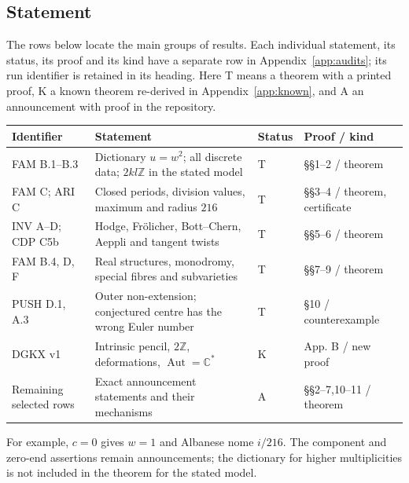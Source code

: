 \documentclass[11pt,a4paper]{article}
\theoremstyle{plain}
\theoremstyle{definition}
\DeclareMathOperator{\Aut}{Aut}
\begin{document}
\subsection*{Statement}
\noindent The rows below locate the main groups of results. Each individual statement, its status, its proof and its kind have a separate row in Appendix~\ref{app:audits}; its run identifier is retained in its heading. Here T means a theorem with a printed proof, K a known theorem re-derived in Appendix~\ref{app:known}, and A an announcement with proof in the repository.
\begin{center}\small
\begin{tabularx}{\linewidth}{@{}lYll@{}}
\toprule Identifier & Statement & Status & Proof / kind\\\midrule
FAM B.1--B.3 & Dictionary $u=w^2$; all discrete data; $2kl\mathbb Z$ in the stated model & T & \S\S1--2 / theorem\\
FAM C; ARI C & Closed periods, division values, maximum and radius $216$ & T & \S\S3--4 / theorem, certificate\\
INV A--D; CDP C5b & Hodge, Fr\"olicher, Bott--Chern, Aeppli and tangent twists & T & \S\S5--6 / theorem\\
FAM B.4, D, F & Real structures, monodromy, special fibres and subvarieties & T & \S\S7--9 / theorem\\
PUSH D.1, A.3 & Outer non-extension; conjectured centre has the wrong Euler number & T & \S10 / counterexample\\
DGKX v1 & Intrinsic pencil, $2\mathbb Z$, deformations, $\Aut=\mathbb C^*$ & K & App. B / new proof\\
Remaining selected rows & Exact announcement statements and their mechanisms & A & \S\S2--7,10--11 / theorem\\
\bottomrule
\end{tabularx}
\end{center}
For example, $c=0$ gives $w=1$ and Albanese nome $i/216$. The component and zero-end assertions remain announcements; the dictionary for higher multiplicities is not included in the theorem for the stated model.
\end{document}

